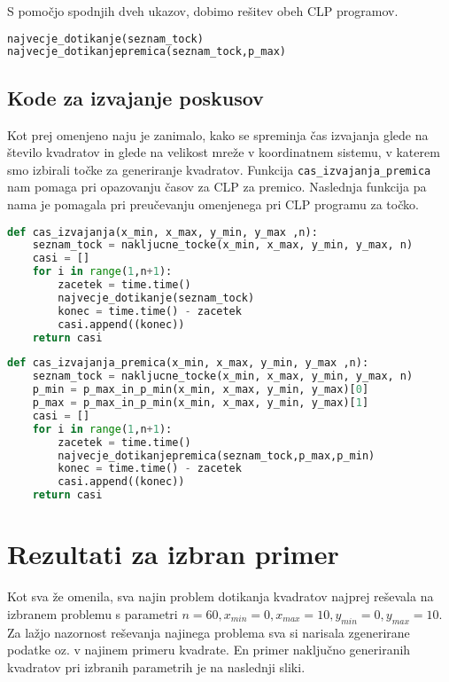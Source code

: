 \documentclass[a4paper]{article}
\begin{document}
S pomočjo spodnjih dveh ukazov, dobimo rešitev obeh CLP programov.

\begin{lstlisting}[language=Python]
najvecje_dotikanje(seznam_tock)
najvecje_dotikanjepremica(seznam_tock,p_max)
\end{lstlisting}

\subsection{Kode za izvajanje poskusov}

Kot prej omenjeno naju je zanimalo, kako se spreminja čas izvajanja glede na število kvadratov in glede na velikost mreže v koordinatnem sistemu, v katerem smo izbirali točke za generiranje kvadratov. Funkcija \texttt{cas\_izvajanja\_premica} nam pomaga pri opazovanju časov za CLP za premico. Naslednja funkcija pa nama je pomagala pri preučevanju omenjenega pri CLP programu za točko.

\begin{lstlisting}[language=Python]
def cas_izvajanja(x_min, x_max, y_min, y_max ,n):
    seznam_tock = nakljucne_tocke(x_min, x_max, y_min, y_max, n)
    casi = []
    for i in range(1,n+1):
        zacetek = time.time()
        najvecje_dotikanje(seznam_tock)
        konec = time.time() - zacetek
        casi.append((konec))
    return casi
\end{lstlisting}

\begin{lstlisting}[language=Python]
def cas_izvajanja_premica(x_min, x_max, y_min, y_max ,n):
    seznam_tock = nakljucne_tocke(x_min, x_max, y_min, y_max, n)
    p_min = p_max_in_p_min(x_min, x_max, y_min, y_max)[0]
    p_max = p_max_in_p_min(x_min, x_max, y_min, y_max)[1]
    casi = []
    for i in range(1,n+1):
        zacetek = time.time()
        najvecje_dotikanjepremica(seznam_tock,p_max,p_min)
        konec = time.time() - zacetek
        casi.append((konec))
    return casi
\end{lstlisting}

\section{Rezultati za izbran primer}

Kot sva že omenila, sva najin problem dotikanja kvadratov najprej reševala na izbranem problemu s parametri $n = 60, x_{min} = 0, x_{max} = 10, y_{min} = 0, y_{max} = 10.$  Za lažjo nazornost reševanja najinega problema sva si narisala zgenerirane podatke oz. v najinem primeru kvadrate. En primer naključno generiranih kvadratov pri izbranih parametrih je na naslednji sliki.
\end{document}
